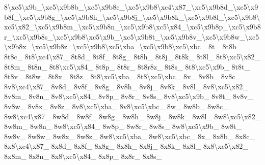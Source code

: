{8\textbackslash{}xc5\textbackslash{}x9b\-\_\textbackslash{}xc5\textbackslash{}x9b8b\-\_\textbackslash{}xc5\textbackslash{}x9b8c\-\_\textbackslash{}xc5\textbackslash{}x9b8\textbackslash{}xc4\textbackslash{}x87\-\_\textbackslash{}xc5\textbackslash{}x9b8d\-\_\textbackslash{}xc5\textbackslash{}x9b8f\-\_\textbackslash{}xc5\textbackslash{}x9b8g\-\_\textbackslash{}xc5\textbackslash{}x9b8h\-\_\textbackslash{}xc5\textbackslash{}x9b8j\-\_\textbackslash{}xc5\textbackslash{}x9b8k\-\_\textbackslash{}xc5\textbackslash{}x9b8l\-\_\textbackslash{}xc5\textbackslash{}x9b8\textbackslash{}xc5\textbackslash{}x82\-\_\textbackslash{}xc5\textbackslash{}x9b8m\-\_\textbackslash{}xc5\textbackslash{}x9b8n\-\_\textbackslash{}xc5\textbackslash{}x9b8\textbackslash{}xc5\textbackslash{}x84\-\_\textbackslash{}xc5\textbackslash{}x9b8p\-\_\textbackslash{}xc5\textbackslash{}x9b8r\-\_\textbackslash{}xc5\textbackslash{}x9b8s\-\_\textbackslash{}xc5\textbackslash{}x9b8\textbackslash{}xc5\textbackslash{}x9b\-\_\textbackslash{}xc5\textbackslash{}x9b8t\-\_\textbackslash{}xc5\textbackslash{}x9b8v\-\_\textbackslash{}xc5\textbackslash{}x9b8w\-\_\textbackslash{}xc5\textbackslash{}x9b8x\-\_\textbackslash{}xc5\textbackslash{}x9b8z\-\_\textbackslash{}xc5\textbackslash{}x9b8\textbackslash{}xc5\textbackslash{}xba\-\_\textbackslash{}xc5\textbackslash{}x9b8\textbackslash{}xc5\textbackslash{}xbc\-\_\- 8t\-\_\- 8t8b\-\_\- 8t8c\-\_\- 8t8\textbackslash{}xc4\textbackslash{}x87\-\_\- 8t8d\-\_\- 8t8f\-\_\- 8t8g\-\_\- 8t8h\-\_\- 8t8j\-\_\- 8t8k\-\_\- 8t8l\-\_\- 8t8\textbackslash{}xc5\textbackslash{}x82\-\_\- 8t8m\-\_\- 8t8n\-\_\- 8t8\textbackslash{}xc5\textbackslash{}x84\-\_\- 8t8p\-\_\- 8t8r\-\_\- 8t8r8z\-\_\- 8t8s\-\_\- 8t8\textbackslash{}xc5\textbackslash{}x9b\-\_\- 8t8t\-\_\- 8t8v\-\_\- 8t8w\-\_\- 8t8x\-\_\- 8t8z\-\_\- 8t8\textbackslash{}xc5\textbackslash{}xba\-\_\- 8t8\textbackslash{}xc5\textbackslash{}xbc\-\_\- 8v\-\_\- 8v8b\-\_\- 8v8c\-\_\- 8v8\textbackslash{}xc4\textbackslash{}x87\-\_\- 8v8d\-\_\- 8v8f\-\_\- 8v8g\-\_\- 8v8h\-\_\- 8v8j\-\_\- 8v8k\-\_\- 8v8l\-\_\- 8v8\textbackslash{}xc5\textbackslash{}x82\-\_\- 8v8m\-\_\- 8v8n\-\_\- 8v8\textbackslash{}xc5\textbackslash{}x84\-\_\- 8v8p\-\_\- 8v8r\-\_\- 8v8s\-\_\- 8v8\textbackslash{}xc5\textbackslash{}x9b\-\_\- 8v8t\-\_\- 8v8v\-\_\- 8v8w\-\_\- 8v8x\-\_\- 8v8z\-\_\- 8v8\textbackslash{}xc5\textbackslash{}xba\-\_\- 8v8\textbackslash{}xc5\textbackslash{}xbc\-\_\- 8w\-\_\- 8w8b\-\_\- 8w8c\-\_\- 8w8\textbackslash{}xc4\textbackslash{}x87\-\_\- 8w8d\-\_\- 8w8f\-\_\- 8w8g\-\_\- 8w8h\-\_\- 8w8j\-\_\- 8w8k\-\_\- 8w8l\-\_\- 8w8\textbackslash{}xc5\textbackslash{}x82\-\_\- 8w8m\-\_\- 8w8n\-\_\- 8w8\textbackslash{}xc5\textbackslash{}x84\-\_\- 8w8p\-\_\- 8w8r\-\_\- 8w8s\-\_\- 8w8\textbackslash{}xc5\textbackslash{}x9b\-\_\- 8w8t\-\_\- 8w8v\-\_\- 8w8w\-\_\- 8w8x\-\_\- 8w8z\-\_\- 8w8\textbackslash{}xc5\textbackslash{}xba\-\_\- 8w8\textbackslash{}xc5\textbackslash{}xbc\-\_\- 8x\-\_\- 8x8b\-\_\- 8x8c\-\_\- 8x8\textbackslash{}xc4\textbackslash{}x87\-\_\- 8x8d\-\_\- 8x8f\-\_\- 8x8g\-\_\- 8x8h\-\_\- 8x8j\-\_\- 8x8k\-\_\- 8x8l\-\_\- 8x8\textbackslash{}xc5\textbackslash{}x82\-\_\- 8x8m\-\_\- 8x8n\-\_\- 8x8\textbackslash{}xc5\textbackslash{}x84\-\_\- 8x8p\-\_\- 8x8r\-\_\- 8x8s\-\_\- }
